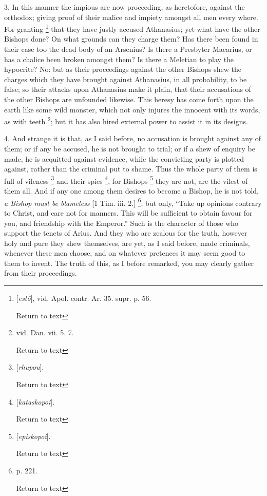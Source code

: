 3. In this manner the impious are now proceeding,
as heretofore, against the orthodox; giving proof of their malice and
impiety amongst all men every where. For granting \footnote{[\emph{est\={o}}], vid. Apol. contr. Ar. 35. supr. p. 56.

Return to text} that they have justly accused Athanasius; yet what have the
other Bishops done? On what grounds can they charge them? Has there
been found in their case too the dead body of an Arsenius? Is there a
Presbyter Macarius, or has a chalice been broken amongst them? Is
there a Meletian to play the hypocrite? No: but as their proceedings
against the other Bishops shew the charges which they have brought
against Athanasius, in all probability, to be false; so their attacks
upon Athanasius make it plain, that their accusations of the other
Bishops are unfounded likewise. This heresy has come forth upon the
earth like some wild monster, which not only injures the innocent with
its words, as with teeth \footnote{vid. Dan. vii. 5. 7.

Return to text};
but it has also hired external power to assist it in its designs.

4. And strange it is that, as I said before, no
accusation is brought against any of them; or if any be accused, he is
not brought to trial; or if a shew of enquiry be made, he is acquitted
against evidence, while the convicting party is plotted against,
rather than the criminal put to shame. Thus the whole party of them is
full of vileness \footnote{[\emph{rhupou}].

Return to text} and
their spies \footnote{[\emph{kataskopoi}].

Return to text}, for
Bishops \footnote{[\emph{episkopoi}].

Return to text} they
are not, are the vilest of them all. And if any one among them desires
to become a Bishop, he is not told, \emph{a Bishop must be blameless}
[1 Tim. iii. 2.] \footnote{p. 221.

Return to text};
but only, ``Take up opinions contrary to Christ, and care not for
manners. This will be sufficient to obtain favour for you, and
friendship with the Emperor.'' Such is the character of those who
support the tenets of Arius. And they who are zealous for the truth,
however holy and pure they shew themselves, are yet, as I said before,
made criminals, whenever these men choose, and on whatever pretences
it may seem good to them to invent. The truth of this, as I before
remarked, you may clearly gather from their proceedings.

